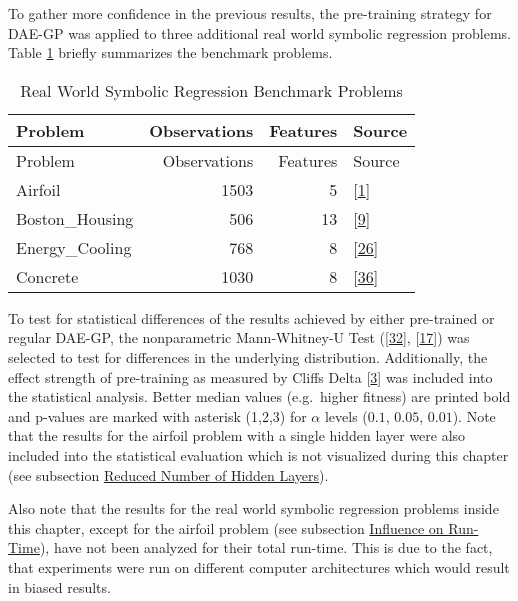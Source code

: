 \documentclass[
  11pt,
]{article}
\begin{document}
To gather more confidence in the previous results, the pre-training strategy for DAE-GP was applied to three additional real world symbolic regression problems.
Table \ref{tab:full-run-realWorldSymReg-problems} briefly summarizes the benchmark problems.

\begin{longtable}[]{@{}lrrl@{}}
\caption{\label{tab:full-run-realWorldSymReg-problems}Real World Symbolic Regression Benchmark Problems}\tabularnewline
\toprule\noalign{}
Problem & Observations & Features & Source \\
\midrule\noalign{}
\endfirsthead
\toprule\noalign{}
Problem & Observations & Features & Source \\
\midrule\noalign{}
\endhead
\bottomrule\noalign{}
\endlastfoot
Airfoil & 1503 & 5 & {[}\protect\hyperlink{ref-AIRFOIL_DATASET}{1}{]} \\
Boston\_Housing & 506 & 13 & {[}\protect\hyperlink{ref-BOSTON_HOUSING_DATASET}{9}{]} \\
Energy\_Cooling & 768 & 8 & {[}\protect\hyperlink{ref-ENERGY_DATASET}{26}{]} \\
Concrete & 1030 & 8 & {[}\protect\hyperlink{ref-CONCRETE_DATASET}{36}{]} \\
\end{longtable}

To test for statistical differences of the results achieved by either pre-trained or regular DAE-GP, the nonparametric Mann-Whitney-U Test ({[}\protect\hyperlink{ref-mwu1}{32}{]}, {[}\protect\hyperlink{ref-mwu2}{17}{]}) was selected to test for differences in the underlying distribution.
Additionally, the effect strength of pre-training as measured by Cliffs Delta {[}\protect\hyperlink{ref-Cliff1993DominanceSO}{3}{]} was included into the statistical analysis.
Better median values (e.g.~higher fitness) are printed bold and p-values are marked with asterisk (1,2,3) for \(\alpha\) levels (\(0.1\), \(0.05\), \(0.01\)).
Note that the results for the airfoil problem with a single hidden layer were also included into the statistical evaluation which is not visualized during this chapter (see subsection \protect\hyperlink{reduced-number-of-hidden-layers-1}{Reduced Number of Hidden Layers}).

Also note that the results for the real world symbolic regression problems inside this chapter, except for the airfoil problem (see subsection \protect\hyperlink{influence-on-run-time-1}{Influence on Run-Time}), have not been analyzed for their total run-time.
This is due to the fact, that experiments were run on different computer architectures which would result in biased results.
\end{document}
